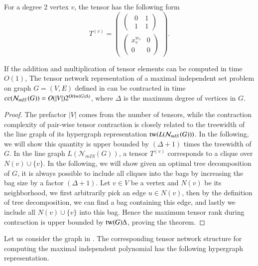 \documentclass[review, onefignum, onetabnum]{siamart190516}
\begin{document}
For a degree 2 vertex $v$, the tensor has the following form
\begin{equation}
    T^{(v)}=\left(\begin{matrix}
    \left(\begin{matrix}
        ~~0 &~1 \\
        ~~1 &~1
    \end{matrix}\right)\\
    \left(\begin{matrix}
        x_v^{w_v} &0 \\
        0 &0
    \end{matrix}\right)
    \end{matrix}\right).
\end{equation}
\begin{theorem}\label{thm:miscomplex}
    If the addition and multiplication of tensor elements can be computed in time $O(1)$,
    The tensor network representation of a maximal independent set problem on graph $G=(V,E)$ defined in  can be contracted in time $cc(\mathcal{N}_{mIS}(G)) = O(|V|)2^{O({\rm tw}(G)\Delta)}$, where $\Delta$ is the maximum degree of vertices in $G$.
\end{theorem}
\begin{proof}
    The prefactor $|V|$ comes from the number of tensors,
    while the contraction complexity of pair-wise tensor contraction is closely related to the treewidth of the line graph of its hypergraph representation ${\rm tw}(L(\mathcal{N}_{mIS}(G)))$.
    In the following, we will show this quantity is upper bounded by $(\Delta+1)$ times the treewidth of $G$.
    In the line graph $L(\mathcal{N}_{mIS}(G))$, a tensor $T^{(v)}$ corresponds to a clique over $N(v) \cup \{v\}$.
    In the following, we will show given an optimal tree decomposition of $G$, it is always possible to include all cliques into the bags by increasing the bag size by a factor $(\Delta + 1)$.
    Let $v \in V$ be a vertex and $N(v)$ be its neighborhood, we first arbitrarily pick an edge $u \in N(v)$,
    then by the definition of tree decomposition, we can find a bag containing this edge, and lastly we include all $N(v) \cup \{v\}$ into this bag.
    Hence the maximum tensor rank during contraction is upper bounded by ${\rm tw}(G)\Delta $, proving the theorem.
\end{proof}
Let us consider the graph in . The corresponding tensor network structure for computing the maximal independent polynomial has the following hypergraph representation. \\
\end{document}
